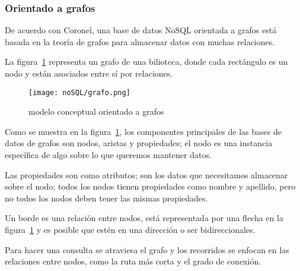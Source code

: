 \subsubsection{Orientado a grafos}
De acuerdo con Coronel\cite{coronel_database_nodate}, una base de datos NoSQL orientada a grafos está basada en la teoría de grafos para almacenar datos con muchas relaciones.



La figura~\ref{img:nosql-grafo} representa un grafo de una bilioteca, donde cada rectángulo es un nodo y están asociados entre sí por relaciones.
\begin{figure}[H] 
    \centering
    \texttt{[image: noSQL/grafo.png]}
    \caption{modelo conceptual orientado a grafos}
    \label{img:nosql-grafo}
\end{figure}


Como se muestra en la figura~\ref{img:nosql-grafo}, los componentes principales de las bases de datos de grafos son nodos, aristas y propiedades; el nodo es una instancia específica de algo sobre lo que queremos mantener datos.


Las propiedades son como atributos; son los datos que necesitamos almacenar sobre el nodo; todos los nodos tienen propiedades como nombre y apellido, pero no todos los nodos deben tener las mismas propiedades.


Un borde es una relación entre nodos, está representada por una flecha en la figura~\ref{img:nosql-grafo} y es posible que estén en una dirección o ser bidireccionales.


Para hacer una consulta se atraviesa el grafo y los recorridos se enfocan en las relaciones entre nodos, como la ruta más corta y el grado de conexión.

